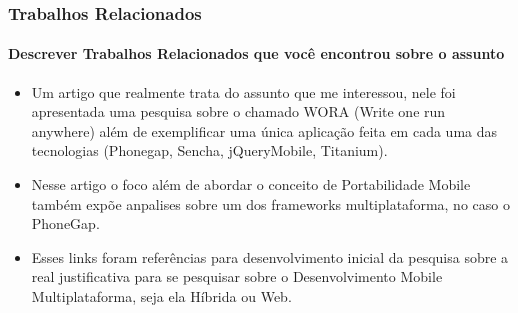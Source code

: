 \documentclass{beamer}
\begin{document}
\begin{frame}
	\frametitle{Trabalhos Relacionados}
	\framesubtitle{Descrever Trabalhos Relacionados que você encontrou sobre o assunto}
	\begin{itemize}
			\item Um artigo que realmente trata do assunto que me interessou, nele foi apresentada uma pesquisa sobre o chamado WORA (Write one run anywhere) além de exemplificar uma única aplicação feita em cada uma das tecnologias (Phonegap, Sencha, jQueryMobile, Titanium).
			\item Nesse artigo o foco além de abordar o conceito de Portabilidade Mobile também expõe anpalises sobre um dos frameworks multiplataforma, no caso o PhoneGap.
			\item Esses links foram referências para desenvolvimento inicial da pesquisa sobre a real justificativa para se pesquisar sobre o Desenvolvimento Mobile Multiplataforma, seja ela Híbrida ou Web.
		\end{itemize}	
	
\end{frame}
\end{document}
